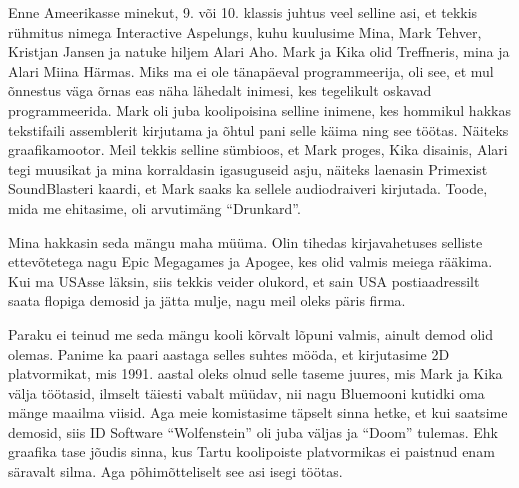 Enne Ameerikasse minekut, 9. või 10. klassis juhtus veel selline asi, et tekkis rühmitus nimega Interactive 
Aspelungs, kuhu kuulusime Mina, Mark Tehver, 
Kristjan Jansen ja natuke hiljem Alari 
Aho. Mark ja Kika olid 
Treffneris, mina ja Alari Miina 
Härmas. Miks ma 
ei ole tänapäeval programmeerija, oli see, et mul õnnestus väga õrnas eas näha 
lähedalt inimesi, kes tegelikult oskavad programmeerida. Mark oli juba koolipoisina selline inimene, kes hommikul hakkas tekstifaili assemblerit 
kirjutama ja õhtul pani selle käima ning see töötas. Näiteks 
graafikamootor. Meil tekkis selline sümbioos, et 
Mark proges, Kika disainis, Alari tegi muusikat ja mina korraldasin igasuguseid asju, näiteks laenasin Primexist SoundBlasteri kaardi, et Mark 
saaks ka sellele audiodraiveri kirjutada. Toode, 
mida me ehitasime, oli arvutimäng \enquote{Drunkard}.

Mina hakkasin seda mängu maha 
müüma. Olin tihedas kirjavahetuses selliste ettevõtetega nagu Epic Megagames ja Apogee, kes olid valmis meiega rääkima. 
Kui ma USAsse läksin, siis tekkis veider olukord, et sain USA 
postiaadressilt saata flopiga demosid ja jätta mulje, nagu meil oleks 
päris firma. 

Paraku ei teinud me seda mängu kooli kõrvalt lõpuni valmis, ainult demod olid 
olemas. Panime ka paari aastaga selles suhtes mööda, et kirjutasime 2D 
platvormikat, mis 1991. aastal oleks olnud selle taseme juures, mis 
Mark ja Kika välja
töötasid, ilmselt täiesti vabalt müüdav, nii nagu 
Bluemooni kutidki oma mänge maailma viisid. Aga meie 
komistasime täpselt sinna hetke, et kui saatsime demosid, siis ID 
Software \enquote{Wolfenstein} oli juba 
väljas ja \enquote{Doom} 
tulemas. Ehk graafika tase jõudis sinna, kus Tartu koolipoiste 
platvormikas ei paistnud enam säravalt silma. Aga põhimõtteliselt see asi isegi töötas.


